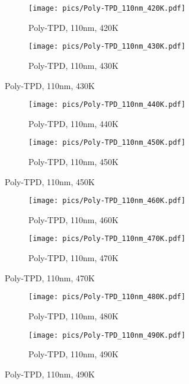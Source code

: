 \begin{figure}[!htb]
\centering
\begin{subfigure}[t]{.5\textwidth}
  \centering
  \texttt{[image: pics/Poly-TPD\_110nm\_420K.pdf]}
  \caption{Poly-TPD, 110nm, 420K}
  \label{fig:sub49}
\end{subfigure}%
\begin{subfigure}[t]{.5\textwidth}
  \centering
  \texttt{[image: pics/Poly-TPD\_110nm\_430K.pdf]}
  \caption{Poly-TPD, 110nm, 430K}
  \label{fig:sub50}
\end{subfigure}%
\end{figure}

\begin{figure}[!htb]
\centering
\begin{subfigure}[t]{.5\textwidth}
  \centering
  \texttt{[image: pics/Poly-TPD\_110nm\_440K.pdf]}
  \caption{Poly-TPD, 110nm, 440K}
  \label{fig:sub51}
\end{subfigure}%
\begin{subfigure}[t]{.5\textwidth}
  \centering
  \texttt{[image: pics/Poly-TPD\_110nm\_450K.pdf]}
  \caption{Poly-TPD, 110nm, 450K}
  \label{fig:sub52}
\end{subfigure}%
\end{figure}

\begin{figure}[!htb]
\centering
\begin{subfigure}[t]{.5\textwidth}
  \centering
  \texttt{[image: pics/Poly-TPD\_110nm\_460K.pdf]}
  \caption{Poly-TPD, 110nm, 460K}
  \label{fig:sub53}
\end{subfigure}%
\begin{subfigure}[t]{.5\textwidth}
  \centering
  \texttt{[image: pics/Poly-TPD\_110nm\_470K.pdf]}
  \caption{Poly-TPD, 110nm, 470K}
  \label{fig:sub54}
\end{subfigure}%
\end{figure}

\begin{figure}[!htb]
\centering
\begin{subfigure}[t]{.5\textwidth}
  \centering
  \texttt{[image: pics/Poly-TPD\_110nm\_480K.pdf]}
  \caption{Poly-TPD, 110nm, 480K}
  \label{fig:sub55}
\end{subfigure}%
\begin{subfigure}[t]{.5\textwidth}
  \centering
  \texttt{[image: pics/Poly-TPD\_110nm\_490K.pdf]}
  \caption{Poly-TPD, 110nm, 490K}
  \label{fig:sub56}
\end{subfigure}%
\end{figure}

